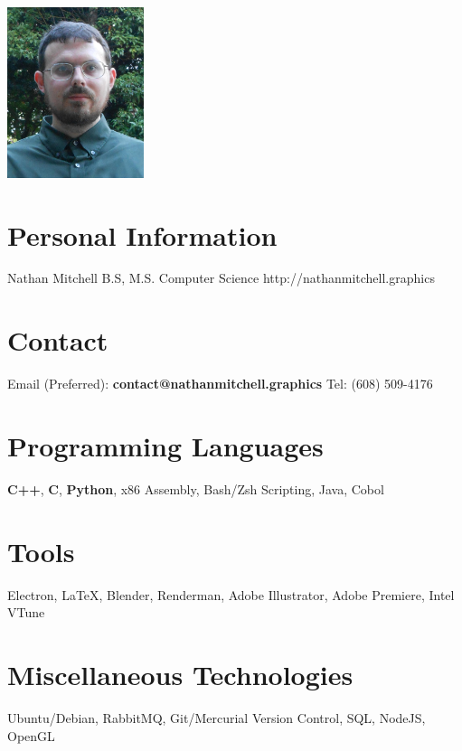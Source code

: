 \documentclass{cv-style}     %
\begin{document}
\lastupdated

\begin{aside}
\includegraphics[width=4cm]{NMitchell_Portrait}
%
\section{Personal Information}
Nathan Mitchell
B.S, M.S. Computer Science
http://nathanmitchell.graphics
\section{Contact}
Email (Preferred):
{\footnotesize \bf contact@nathanmitchell.graphics}
Tel:
(608) 509-4176
\section{Programming Languages}
\textbf{C++}, \textbf{C}, \textbf{Python}, x86 Assembly, Bash/Zsh Scripting,
Java, Cobol
%
\section{Tools}
Electron, LaTeX, Blender, Renderman, Adobe
Illustrator, Adobe Premiere, Intel VTune
\section{Miscellaneous Technologies}
Ubuntu/Debian, RabbitMQ,
Git/Mercurial Version
Control, SQL, NodeJS, OpenGL
%
\end{aside}
\vspace{0.2cm}
\end{document}
